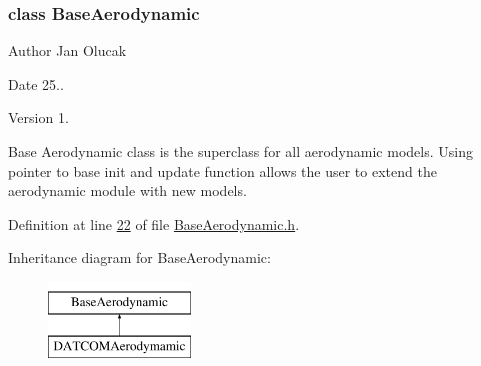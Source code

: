 \subsubsection{class Base\+Aerodynamic}
\begin{DoxyAuthor}{Author}
Jan Olucak 
\end{DoxyAuthor}
\begin{DoxyDate}{Date}
25.. 
\end{DoxyDate}
\begin{DoxyVersion}{Version}
1.
\end{DoxyVersion}
Base Aerodynamic class is the superclass for all aerodynamic models. Using pointer to base init and update function allows the user to extend the aerodynamic module with new models. 

Definition at line \hyperlink{_base_aerodynamic_8h_source_l00022}{22} of file \hyperlink{_base_aerodynamic_8h_source}{Base\+Aerodynamic.\+h}.

Inheritance diagram for Base\+Aerodynamic\+:\begin{figure}[H]
\begin{center}
\leavevmode
\includegraphics[height=2.000000cm]{group___aerodynamic}
\end{center}
\end{figure}
